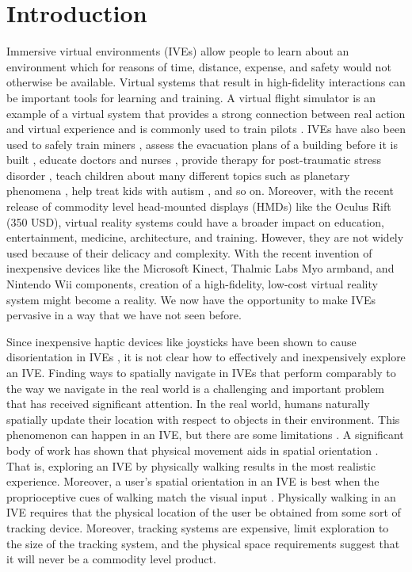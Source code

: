 \documentclass[titlepage]{article}
\theoremstyle{definition}
\theoremstyle{proof}
\begin{document}
\section{Introduction}
Immersive virtual environments (IVEs) allow people to learn about
an environment which for reasons of time, distance, expense, and
safety would not otherwise be available.
Virtual systems that result in high-fidelity interactions can be important tools for learning and training.
A virtual flight simulator is an example of a virtual system that provides a strong connection between real action
and virtual experience and is commonly used to train pilots \cite{trove.nla.gov.au/work/12170008}.
IVEs have also been used to safely train miners \cite{vanWyk2009VRT15034541503465},
assess the evacuation plans of a building before it is built \cite{Ruppel2011DBS2043741.2043863},
educate doctors and nurses \cite{torkington},
provide therapy for post-traumatic stress disorder \cite{rothbaum},
teach children about many different topics such as planetary phenomena \cite{doi:10.1080/09500690305027},
help treat kids with autism \cite{mitchell},
and so on.
Moreover, with the recent release of commodity level head-mounted displays (HMDs) like the Oculus Rift (350 USD),
virtual reality systems could have a broader impact on
education, entertainment, medicine, architecture, and training.
However, they are not widely used because of their delicacy and complexity.
With the recent invention of inexpensive devices like the Microsoft Kinect,
Thalmic Labs Myo armband, and Nintendo Wii components,
creation of a high-fidelity, low-cost virtual reality system might become a reality.
We now have the opportunity to make IVEs pervasive in a way that we have not seen before.

Since inexpensive haptic devices like joysticks have been shown to cause
disorientation in IVEs \cite{Chance1998:Presence,Ruddle2006:FENS,Lathrop2002:PO},
it is not clear how to effectively and inexpensively explore an IVE.
Finding ways to spatially navigate in IVEs that perform comparably to the way we navigate in the
real world is a challenging and important problem that has received significant attention.
In the real world, humans naturally spatially
update their location with respect to objects in their environment.
This phenomenon can happen in an IVE, but there are some limitations \cite{kelly}.
A significant body of work has shown that
physical movement aids in spatial orientation \cite{Ruddle2006:FENS,waller}.
That is, exploring an IVE by physically walking results in the most realistic experience.
Moreover, a user's spatial orientation in an IVE is best when the proprioceptive
cues of walking match the visual input \cite{Ruddle:2009:BUW:1502800.1502805}.
Physically walking in an IVE requires that the physical location of the user be obtained from
some sort of tracking device.
Moreover, tracking systems are expensive, limit exploration to the size of the tracking system, and
the physical space requirements suggest that it will never be a commodity level product.
\end{document}

